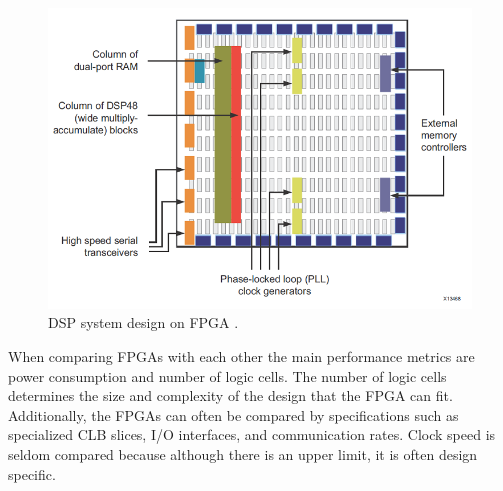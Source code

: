 \documentclass[12pt]{report}
\begin{document}
\begin{figure}[h]
    \centering
    \includegraphics[scale=0.5]{figures/contemporary_fpga.png}
    \caption{DSP system design on FPGA \citep{XilFPGAIntro}.}
    \label{fig:5}
\end{figure}

When comparing FPGAs with each other the main performance metrics are power consumption and number of logic cells. The number of logic cells determines the size and complexity of the design that the FPGA can fit. Additionally, the FPGAs can often be compared by specifications such as specialized CLB slices, I/O interfaces, and communication rates. Clock speed is seldom compared because although there is an upper limit, it is often design specific. \citep{XilClbMan} \citep{XilFPGAIntro} 
\end{document}
